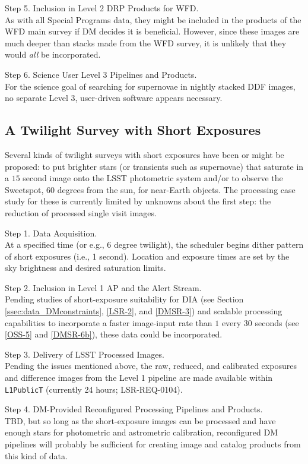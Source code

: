 \documentclass[DM,lsstdraft,toc]{lsstdoc}
\begin{document}
Step 5. Inclusion in Level 2 DRP Products for WFD. \\ 
As with all Special Programs data, they might be included in the products of the WFD main survey if DM decides it is beneficial. However, since these images are much deeper than stacks made from the WFD survey, it is unlikely that they would {\it all} be incorporated. 

Step 6. Science User Level 3 Pipelines and Products. \\
For the science goal of searching for supernovae in nightly stacked DDF images, no separate Level 3, user-driven software appears necessary. 


\subsection{A Twilight Survey with Short Exposures}\label{ssec:SPCS_Twilight}

Several kinds of twilight surveys with short exposures have been or might be proposed: to put brighter stars (or transients such as supernovae) that saturate in a $15$ second image onto the LSST photometric system and/or to observe the Sweetspot, 60 degrees from the sun, for near-Earth objects. The processing case study for these is currently limited by unknowns about the first step: the reduction of processed single visit images.

Step 1. Data Acquisition. \\
At a specified time (or e.g., 6 degree twilight), the scheduler begins dither pattern of short exposures (i.e., 1 second). Location and exposure times are set by the sky brightness and desired saturation limits. 

Step 2. Inclusion in Level 1 AP and the Alert Stream. \\
Pending studies of short-exposure suitability for DIA (see Section \ref{ssec:data_DMconstraints}, \ref{LSR-2}, and \ref{DMSR-3}) and scalable processing capabilities to incorporate a faster image-input rate than $1$ every $30$ seconds (see \ref{OSS-5} and \ref{DMSR-6b}), these data could be incorporated.

Step 3. Delivery of LSST Processed Images. \\
Pending the issues mentioned above, the raw, reduced, and calibrated exposures and difference images from the Level 1 pipeline are made available within  {\tt L1PublicT} (currently 24 hours; LSR-REQ-0104).

Step 4. DM-Provided Reconfigured Processing Pipelines and Products. \\
TBD, but so long as the short-exposure images can be processed and have enough stars for photometric and astrometric calibration, reconfigured DM pipelines will probably be sufficient for creating image and catalog products from this kind of data.
\end{document}
